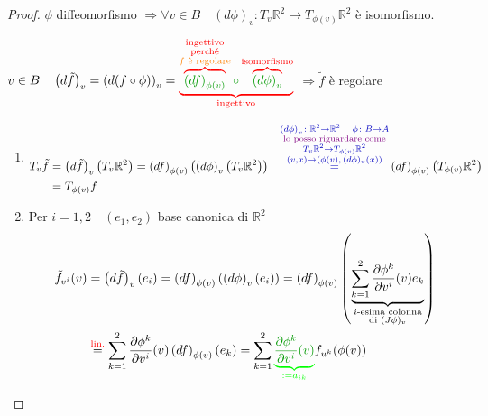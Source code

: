         \begin{proof}
        \mbox{}
        
        $\phi$ diffeomorfismo $\Rightarrow \forall v \in B \quad (d \phi)_v \colon T_v \mathbb{R}^2 \to T_{\phi(v)} \mathbb{R}^2$ è isomorfismo.

        $v \in B \quad \left(d \tilde{f}\right)_v = \left(d (f \circ \phi)\right)_v=
        \color{red}\underbrace{\overbrace{\textcolor{verde}{\left(d f\right)_{\phi(v)}}}^{\substack{\text{ingettivo} \\ \text{perché} \\ \textcolor{orange}{f \text{ è regolare}}}} \textcolor{verde}{\circ} \overbrace{ \textcolor{verde}{\left(d \phi\right)_v}}^{\text{isomorfismo}}}_{\text{ingettivo}}$ $\Rightarrow \tilde{f}$ è regolare 
        \begin{enumerate}
            \item 
            \begin{align*} 
            T_v \tilde{f} &= \left(d \tilde{f}\right)_v \left(T_v \mathbb{R}^2\right) = \left(df \right)_{\phi(v)} \left( \left(d \phi\right)_v \left(T_v \mathbb{R}^2\right) \right) 
            &\textcolor{blu}{\overset{\substack{\left(d \phi\right)_v \colon \mathbb{R}^2 \to \mathbb{R}^2 \quad \phi \colon B \to A \\ \text{\textcolor{violet}{lo posso riguardare come}} \\T_v \mathbb{R}^2 \to T_{\phi(v)} \mathbb{R}^2 \\ (v,x) \mapsto \left(\phi(v) ,\, (d \phi)_v (x) \right) }}{=}} 
            \left(df\right)_{\phi(v)} \left(T_{\phi(v)} \mathbb{R}^2 \right)\\
            &= T_{\phi(v)} f
            \end{align*}
            \item Per $i=1,2 \quad (e_1,e_2)$ base canonica di $\mathbb{R}^2$ 
            \begin{align*} 
            \tilde{f}_{v^i}(v) &= \left(d \tilde{f}\right)_v (e_i) = \left(d f\right)_{\phi(v)} \left( \left(d \phi\right)_v (e_i) \right)= \left(df\right)_{\phi(v)} \left( \underbrace{\sum_{k=1}^{2} \frac{\partial \phi^k}{\partial v^i}(v) e_k}_{\substack{\text{$i$-esima colonna}\\ \text{di } (J \phi)_v}} \right) \\
            &\overset{\textcolor{red}{\text{lin.}}}{=} \sum_{k=1}^{2} \frac{\partial \phi^k}{\partial v^i}(v) \left(df\right)_{\phi(v)} (e_k) = \sum_{k=1}^{2} \textcolor{green}{\underbrace{\textcolor{verde}{\frac{\partial \phi^k}{\partial v^i}(v)}}_{:= a_{ik}}}  f_{u^k}(\phi(v))

\end{align*}
\end{enumerate}
\end{proof}
